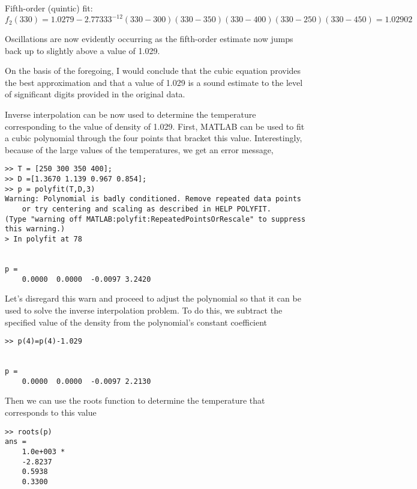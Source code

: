 \documentclass[../main.tex]{subfiles}
\begin{document}
	\bigbreak
Fifth-order (quintic) fit:
	\bigbreak
$f_{2}(330)=1.0279-2.77333^{-12}(330-300)(330-350)(330-400)(330-250)(330-450)=1.02902$
	\bigbreak
\begin{blockquote}
Oscillations are now evidently occurring as the fifth-order estimate now jumps back up to
slightly above a value of 1.029. 
\end{blockquote}
	\bigbreak
\begin{blockquote}
On the basis of the foregoing, I would conclude that the cubic equation provides the best
approximation and that a value of 1.029 is a sound estimate to the level of significant digits
provided in the original data. 
\end{blockquote}
	\bigbreak
\begin{blockquote}
Inverse interpolation can be now used to determine the temperature corresponding to the
value of density of 1.029. First, MATLAB can be used to fit a cubic polynomial through
the four points that bracket this value. Interestingly, because of the large values of the
temperatures, we get an error message,
\end{blockquote}
	\bigbreak
\begin{lstlisting}[numbers=none]
>> T = [250 300 350 400];
>> D =[1.3670 1.139 0.967 0.854];
>> p = polyfit(T,D,3)
Warning: Polynomial is badly conditioned. Remove repeated data points
	or try centering and scaling as described in HELP POLYFIT.
(Type "warning off MATLAB:polyfit:RepeatedPointsOrRescale" to suppress
this warning.)
> In polyfit at 78


p =
	0.0000	0.0000	-0.0097	3.2420 
\end{lstlisting}
	\bigbreak
\begin{blockquote}
Let’s disregard this warn and proceed to adjust the polynomial so that it can be used to
solve the inverse interpolation problem. To do this, we subtract the specified value of the
density from the polynomial’s constant coefficient 
\end{blockquote}
	\bigbreak
\begin{lstlisting}[numbers=none]
>> p(4)=p(4)-1.029


p =
	0.0000	0.0000	-0.0097	2.2130 
\end{lstlisting}
	\bigbreak
Then we can use the roots function to determine the temperature that corresponds to this
value
	\bigbreak
\begin{lstlisting}[numbers=none]
>> roots(p)
ans =
	1.0e+003 *
	-2.8237
	0.5938
	0.3300
\end{lstlisting}
	\bigbreak
\end{document}
